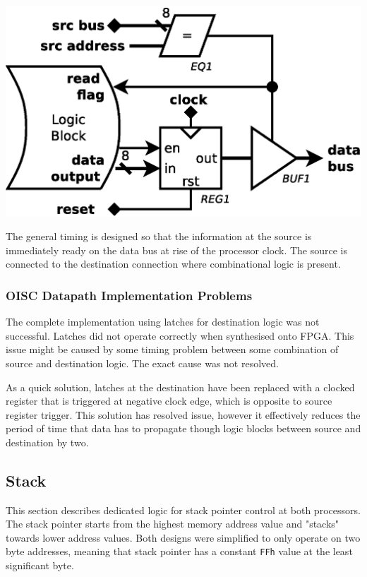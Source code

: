 \begin{colfigure}
	\centering
	\includegraphics[width=\linewidth]{../resources/oisc_cell_out.eps}
	\label{fig:oisc_cell_out}
\end{colfigure}

The general timing is designed so that the information at the source is immediately ready on the data bus at rise of the processor clock. The source is connected to the destination connection where combinational logic is present. 

\subsubsection{OISC Datapath Implementation Problems} \label{subsec:oisc_cell_issue}

The complete implementation using latches for destination logic was not successful. Latches did not operate correctly when synthesised onto FPGA. This issue might be caused by some timing problem between some combination of source and destination logic. The exact cause was not resolved.

As a quick solution, latches at the destination have been replaced with a clocked register that is triggered at negative clock edge, which is opposite to source register trigger. This solution has resolved issue, however it effectively reduces the period of time that data has to propagate though logic blocks between source and destination by two.

\subsection{Stack} \label{subsec:stack}
This section describes dedicated logic for stack pointer control at both processors. The stack pointer starts from the highest memory address value and "stacks" towards lower address values. Both designs were simplified to only operate on two byte addresses, meaning that stack pointer has a constant \texttt{FFh} value at the least significant byte.


